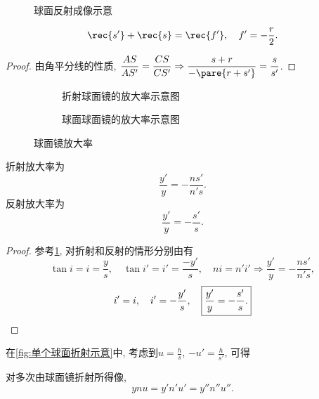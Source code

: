 \documentclass{ctexart}
\begin{document}
\begin{figure}[ht]
    \centering
    \caption{球面反射成像示意}
\end{figure}
\begin{finale}
    \begin{theorem}[球面反射成像]
        \[ \rec{s'} + \rec{s} = \rec{f'},\quad f' = -\frac{r}{2}. \]
    \end{theorem}
\end{finale}
\begin{proof}
    由角平分线的性质, $\displaystyle \frac{AS}{AS'} = \frac{CS}{CS'} \Rightarrow \frac{s+r}{-\pare{r+s'}} = \frac{s}{s'}$.
\end{proof}
\begin{figure}[ht]
    \centering
    \begin{subfigure}{.9\textwidth}
        \centering
        \caption{折射球面镜的放大率示意图}
    \end{subfigure}
    \begin{subfigure}{.9\textwidth}
        \centering
        \caption{球面球面镜的放大率示意图}
    \end{subfigure}
    \caption{球面镜放大率}
    \label{fig:球面镜放大率}
\end{figure}
\begin{finale}
    \begin{theorem}[球面镜横向放大率公式]
        \label{thm:球面镜横向放大率公式}
        折射放大率为
        \[ \frac{y'}{y} = -\frac{ns'}{n's}. \]
        反射放大率为
        \[ \frac{y'}{y} = -\frac{s'}{s}. \]
    \end{theorem}
\end{finale}
\begin{proof}
    参考\cref{fig:球面镜放大率}, 对折射和反射的情形分别由有
    \[ \tan i = i = \frac{y}{s},\quad \tan i' = i' = \frac{-y'}{s},\quad ni = n'i'\Rightarrow \boxed{\frac{y'}{y} = -\frac{ns'}{n's},} \]
    \[ i' = i,\quad i' = -\frac{y'}{s},\quad \boxed{\frac{y'}{y} = -\frac{s'}{s}.} \qedhere \]
\end{proof}
在\cref{fig:单个球面折射示意}中, 考虑到$\displaystyle u = \frac{h}{s}$, $\displaystyle -u' = \frac{h}{s'}$, 可得
\begin{finale}
    \begin{theorem}
        \label{thm:Lagrange-Helmholtz定理}
        对多次由球面镜折射所得像,
        \[ ynu = y'n'u' = y''n''u''. \]
    \end{theorem}
\end{finale}
\end{document}
